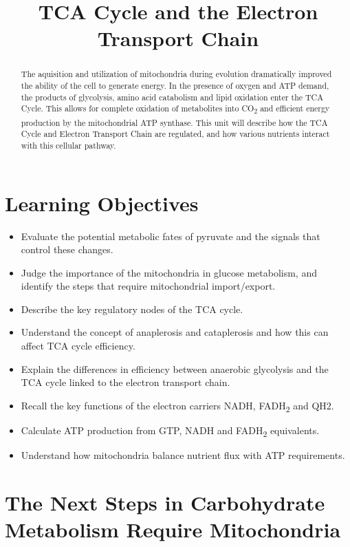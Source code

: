\documentclass{tufte-handout}
\title{TCA Cycle and the Electron Transport Chain}
\author{}
\date{}  %
\begin{document}
\maketitle%

\begin{abstract}
\noindent The aquisition and utilization of mitochondria during evolution dramatically improved the ability of the cell to generate energy.  In the presence of oxygen and ATP demand, the products of glycolysis, amino acid catabolism and lipid oxidation enter the TCA Cycle.  This allows for complete oxidation of metabolites into CO\textsubscript{2} and efficient energy production by the mitochondrial ATP synthase.  This unit will describe how the TCA Cycle and Electron Transport Chain are regulated, and how various nutrients interact with this cellular pathway.
\end{abstract}
\tableofcontents
\pagebreak
\section{Learning Objectives}

\begin{itemize}
\item Evaluate the potential metabolic fates of pyruvate and the signals that control these changes.
\item Judge the importance of the mitochondria in glucose metabolism, and identify the steps that require mitochondrial import/export.
\item Describe the key regulatory nodes of the TCA cycle.
\item Understand the concept of anaplerosis and cataplerosis and how this can affect TCA cycle efficiency.
\item Explain the differences in efficiency between anaerobic glycolysis and the TCA cycle linked to the electron transport chain.
\item Recall the key functions of the electron carriers NADH, FADH\textsubscript{2} and QH2.
\item Calculate ATP production from GTP, NADH and FADH\textsubscript{2} equivalents.
\item Understand how mitochondria balance nutrient flux with ATP requirements.
\end{itemize}

\section{The Next Steps in Carbohydrate Metabolism Require Mitochondria}
\end{document}
